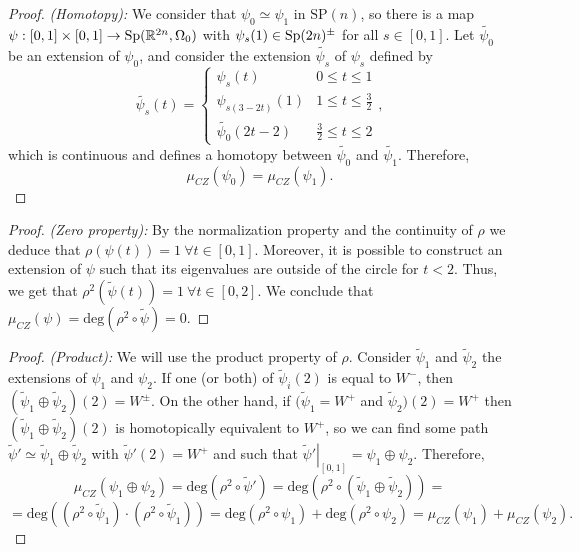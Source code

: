 \begin{proof} {\it (Homotopy):} We consider that $\psi_0 \simeq \psi_1$ in $\text{SP}(n)$, so there is a map $\psi : [0,1] \times [0,1] \rightarrow \text{Sp}(\mathbb{R}^{2n},\Omega_0)$ with $\psi_s(1) \in \text{Sp}(2n)^{\pm}$ for all $s \in [0,1]$.
Let $\widetilde{\psi_0}$ be an extension of $\psi_0$, and consider the extension $\widetilde{\psi_s}$ of $\psi_s$ defined by
\[\widetilde{\psi_s}(t) = \left\{ \begin{array}{lc} \psi_s(t) & 0 \leq t \leq 1 \\ \psi_{s(3-2t)}(1) & 1 \leq t \leq \frac32 \\ \widetilde{\psi_0}(2t-2) & \frac32 \leq t \leq 2 \end{array} \right. ,\]
which is continuous and defines a homotopy between $\widetilde{\psi_0}$ and $\widetilde{\psi_1}$. Therefore,
\[\mu_{CZ}(\psi_0) = \mu_{CZ}(\psi_1) .\]
\end{proof}

\begin{proof} {\it (Zero property):} By the normalization property and the continuity of $\rho$ we deduce that $\rho(\psi(t)) = 1 \ \forall t \in [0,1]$. Moreover, it is possible to construct an extension of $\psi$ such that its eigenvalues are outside of the circle for $t < 2$. Thus, we get that $\rho^2(\widetilde{\psi}(t)) = 1 \ \forall t \in [0,2]$. We conclude that $\mu_{CZ}(\psi) = \text{deg}(\rho^2 \circ \widetilde{\psi}) = 0$.
\end{proof}

\begin{proof} {\it (Product):} We will use the product property of $\rho$. Consider $\widetilde{\psi}_1$ and $\widetilde{\psi}_2$ the extensions of $\psi_1$ and $\psi_2$. If one (or both) of $\widetilde{\psi}_i(2)$ is equal to $W^-$, then $(\widetilde{\psi}_1 \oplus \widetilde{\psi}_2)(2) = W^{\pm}$. On the other hand, if $(\widetilde{\psi}_1 = W^+$ and $\widetilde{\psi}_2)(2) = W^+$ then $(\widetilde{\psi}_1 \oplus \widetilde{\psi}_2)(2)$ is homotopically equivalent to $W^+$, so we can find some path $\widetilde{\psi}' \simeq \widetilde{\psi}_1 \oplus \widetilde{\psi}_2$ with $\widetilde{\psi}'(2) = W^+$ and such that $\left. \widetilde{\psi}' \right|_{[0,1]} = \psi_1 \oplus \psi_2$. Therefore,
\[\mu_{CZ}(\psi_1 \oplus \psi_2) = \text{deg}(\rho^2 \circ \widetilde{\psi}') = \text{deg}(\rho^2 \circ (\widetilde{\psi}_1 \oplus \widetilde{\psi}_2)) =\]
\[= \text{deg}((\rho^2 \circ \widetilde{\psi}_1) \cdot (\rho^2 \circ \widetilde{\psi}_1)) = \text{deg}(\rho^2 \circ \psi_1) + \text{deg}(\rho^2 \circ \psi_2) = \mu_{CZ}(\psi_1) + \mu_{CZ}(\psi_2) .\]
\end{proof}

